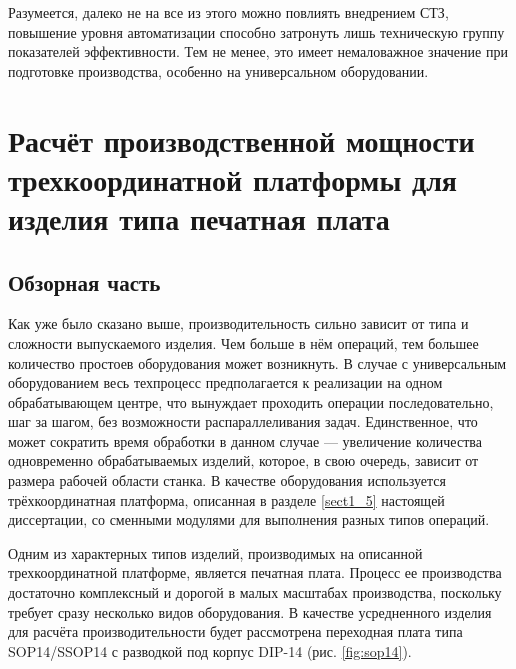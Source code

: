 Разумеется, далеко не на все из этого можно повлиять внедрением СТЗ, повышение уровня автоматизации способно затронуть лишь техническую группу показателей эффективности. Тем не менее, это имеет немаловажное значение при подготовке производства, особенно на универсальном оборудовании.

\section{Расчёт производственной мощности трехкоординатной платформы для изделия типа печатная плата} \label{sect2_3}

\subsection{Обзорная часть} \label{ssect2_3_1}

Как уже было сказано выше, производительность сильно зависит от типа и сложности выпускаемого изделия. Чем больше в нём операций, тем большее количество простоев оборудования может возникнуть. В случае с универсальным оборудованием весь техпроцесс предполагается к реализации на одном обрабатывающем центре, что вынуждает проходить операции последовательно, шаг за шагом, без возможности распараллеливания задач. Единственное, что может сократить время обработки в данном случае --- увеличение количества одновременно обрабатываемых изделий, которое, в свою очередь, зависит от размера рабочей области станка. В качестве оборудования используется трёхкоординатная платформа, описанная в разделе \ref{sect1_5} настоящей диссертации, со сменными модулями для выполнения разных типов операций.

Одним из характерных типов изделий, производимых на описанной трехкоординатной платформе, является печатная плата. Процесс ее производства достаточно комплексный и дорогой в малых масштабах производства, поскольку требует сразу несколько видов оборудования. В качестве усредненного изделия для расчёта производительности будет рассмотрена переходная плата типа SOP14/SSOP14 с разводкой под корпус DIP-14 (рис. \cref{fig:sop14}).


